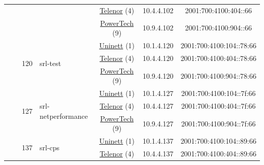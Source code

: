 \begin{small}
\begin{center}
\begin{longtable}{|c|c|c|c|c|c|c|c|}
  &  & \multicolumn{2}{|c|}{} & \multicolumn{2}{|c|}{\tiny{\href{https://www.telenor.no}{Telenor} (4)}} & \tiny{10.4.4.102} & \tiny{2001:700:4100:404::66} \\* \cline{5-5}\cline{6-6}\cline{7-7}\cline{8-8}
  &  & \multicolumn{2}{|c|}{} & \multicolumn{2}{|c|}{\tiny{\href{http://www.powertech.no}{PowerTech} (9)}} & \tiny{10.9.4.102} & \tiny{2001:700:4100:904::66} \\* \cline{3-3}\cline{4-4}\cline{5-5}\cline{6-6}\cline{7-7}\cline{8-8}
  &  & \multirow{3}{*}{\tiny{120}} & \multicolumn{1}{|l|}{\multirow{3}{*}{\tiny{srl-test}}} & \multicolumn{2}{|c|}{\tiny{\href{https://www.uninett.no}{Uninett} (1)}} & \tiny{10.1.4.120} & \tiny{2001:700:4100:104::78:66} \\* \cline{5-5}\cline{6-6}\cline{7-7}\cline{8-8}
  &  &  &  & \multicolumn{2}{|c|}{\tiny{\href{https://www.telenor.no}{Telenor} (4)}} & \tiny{10.4.4.120} & \tiny{2001:700:4100:404::78:66} \\* \cline{5-5}\cline{6-6}\cline{7-7}\cline{8-8}
  &  &  &  & \multicolumn{2}{|c|}{\tiny{\href{http://www.powertech.no}{PowerTech} (9)}} & \tiny{10.9.4.120} & \tiny{2001:700:4100:904::78:66} \\* \cline{3-3}\cline{4-4}\cline{5-5}\cline{6-6}\cline{7-7}\cline{8-8}
  &  & \multirow{3}{*}{\tiny{127}} & \multicolumn{1}{|l|}{\multirow{3}{*}{\tiny{srl-netperformance}}} & \multicolumn{2}{|c|}{\tiny{\href{https://www.uninett.no}{Uninett} (1)}} & \tiny{10.1.4.127} & \tiny{2001:700:4100:104::7f:66} \\* \cline{5-5}\cline{6-6}\cline{7-7}\cline{8-8}
  &  &  &  & \multicolumn{2}{|c|}{\tiny{\href{https://www.telenor.no}{Telenor} (4)}} & \tiny{10.4.4.127} & \tiny{2001:700:4100:404::7f:66} \\* \cline{5-5}\cline{6-6}\cline{7-7}\cline{8-8}
  &  &  &  & \multicolumn{2}{|c|}{\tiny{\href{http://www.powertech.no}{PowerTech} (9)}} & \tiny{10.9.4.127} & \tiny{2001:700:4100:904::7f:66} \\* \cline{3-3}\cline{4-4}\cline{5-5}\cline{6-6}\cline{7-7}\cline{8-8}
  &  & \multirow{3}{*}{\tiny{137}} & \multicolumn{1}{|l|}{\multirow{3}{*}{\tiny{srl-cps}}} & \multicolumn{2}{|c|}{\tiny{\href{https://www.uninett.no}{Uninett} (1)}} & \tiny{10.1.4.137} & \tiny{2001:700:4100:104::89:66} \\* \cline{5-5}\cline{6-6}\cline{7-7}\cline{8-8}
  &  &  &  & \multicolumn{2}{|c|}{\tiny{\href{https://www.telenor.no}{Telenor} (4)}} & \tiny{10.4.4.137} & \tiny{2001:700:4100:404::89:66} \\* \cline{5-5}\cline{6-6}\cline{7-7}\cline{8-8}

\end{longtable}
\end{center}
\end{small}
